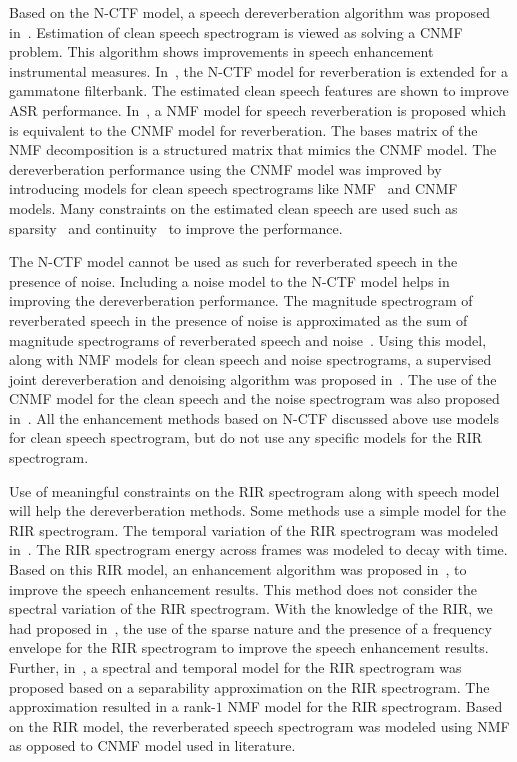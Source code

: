 Based on the N-CTF model, a speech dereverberation algorithm was proposed in~\cite{kameoka2009robust}. Estimation of clean speech spectrogram is viewed as solving a CNMF problem. This algorithm shows improvements in speech enhancement instrumental measures. In~\cite{Kumar2011}, the N-CTF model for reverberation is extended for a gammatone filterbank. The estimated clean speech features are shown to improve ASR performance. In~\cite{Kallasjoki2014}, a NMF model for speech reverberation is proposed which is equivalent to the CNMF model for reverberation. The bases matrix of the NMF decomposition is a structured matrix that mimics the CNMF model. 
The dereverberation performance using the CNMF model was improved by introducing models for clean speech spectrograms like NMF~\cite{mohammadiha2016speech, Mohammadiha2015} and CNMF~\cite{Mirsamadi2014} models. Many constraints on the estimated clean speech are used such as sparsity~\cite{mohammadiha2016speech, Mohammadiha2015} and continuity~\cite{wager2018collaborative} to improve the performance.

The N-CTF model cannot be used as such for reverberated speech in the presence of noise. Including a noise model to the N-CTF model helps in improving the dereverberation performance. The magnitude spectrogram of reverberated speech in the presence of noise is approximated as the sum of magnitude spectrograms of reverberated speech and noise~\cite{li2018multichannel}. Using this model, along with NMF models for clean speech and noise spectrograms, a supervised joint dereverberation and denoising algorithm was proposed in~\cite{baby2016supervised}. The use of the CNMF model for the clean speech and the noise spectrogram was also proposed in~\cite{baby2016supervised, baby2016phd}. All the enhancement methods based on N-CTF discussed above use models for clean speech spectrogram, but do not use any specific models for the RIR spectrogram.

Use of meaningful constraints on the RIR spectrogram along with speech model will help the dereverberation methods. Some methods use a simple model for the RIR spectrogram. The temporal variation of the RIR spectrogram was modeled in~\cite{baby2016supervised}. The RIR spectrogram energy across frames was modeled to decay with time. Based on this RIR model, an enhancement algorithm was proposed in~\cite{baby2017joint}, to improve the speech enhancement results. This method does not consider the spectral variation of the RIR spectrogram. With the knowledge of the RIR, we had proposed in~\cite{mohanan2017speech}, the use of the sparse nature and the presence of a frequency envelope for the RIR spectrogram to improve the speech enhancement results. Further, in~\cite{mohanan201a}, a spectral and temporal model for the RIR spectrogram was proposed based on a separability approximation on the RIR spectrogram. The approximation resulted in a rank-$1$ NMF model for the RIR spectrogram. Based on the RIR model, the reverberated speech spectrogram was modeled using NMF as opposed to CNMF model used in literature.

